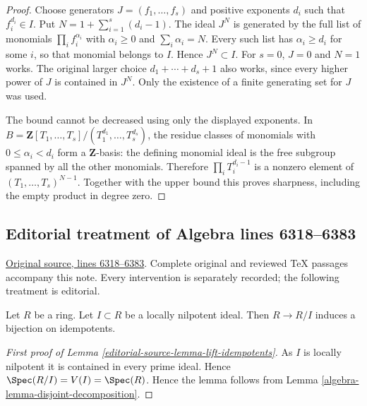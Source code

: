 \begin{proof}
Choose generators $J=(f_1,\ldots,f_s)$ and positive exponents
$d_i$ such that $f_i^{d_i}\in I$. Put $N=1+\sum_{i=1}^s(d_i-1)$.
The ideal $J^N$ is generated by the full list of monomials
$\prod_i f_i^{\alpha_i}$ with $\alpha_i\geq0$ and $\sum_i\alpha_i=N$.
Every such list has $\alpha_i\geq d_i$ for some $i$, so that monomial
belongs to $I$. Hence $J^N\subset I$. For $s=0$, $J=0$ and $N=1$
works. The original larger choice $d_1+\cdots+d_s+1$ also works,
since every higher power of $J$ is contained in $J^N$.
Only the existence of a finite generating set for $J$ was used.

\medskip\noindent
The bound cannot be decreased using only the displayed exponents.
In $B=\mathbf Z[T_1,\ldots,T_s]/(T_1^{d_1},\ldots,T_s^{d_s})$,
the residue classes of monomials with $0\leq\alpha_i<d_i$ form a
$\mathbf Z$-basis: the defining monomial ideal is the free subgroup
spanned by all the other monomials. Therefore
$\prod_i T_i^{d_i-1}$ is a nonzero element of
$(T_1,\ldots,T_s)^{N-1}$. Together with the upper bound this proves
sharpness, including the empty product in degree zero.
\end{proof}


\subsection{Editorial treatment of Algebra lines 6318--6383}

\hypertarget{algebra-context-049}{}

\noindent\href{https://github.com/stacks/stacks-project/blob/a04446e57ec1fbc252a871afcec7752fb2807b14/algebra.tex\#L6318}{Original source, lines 6318--6383}. Complete original and reviewed TeX passages accompany this note. Every intervention is separately recorded; the following treatment is editorial.


\begin{lemma}
\label{editorial-source-lemma-lift-idempotents}
Let $R$ be a ring. Let $I \subset R$ be a locally nilpotent ideal.
Then $R \to R/I$ induces a bijection on idempotents.
\end{lemma}

\begin{proof}[First proof of Lemma \ref{editorial-source-lemma-lift-idempotents}]
As $I$ is locally nilpotent it is contained in every prime ideal.
Hence $\Spec(R/I) = V(I) = \Spec(R)$. Hence the
lemma follows from Lemma \ref{algebra-lemma-disjoint-decomposition}.
\end{proof}

